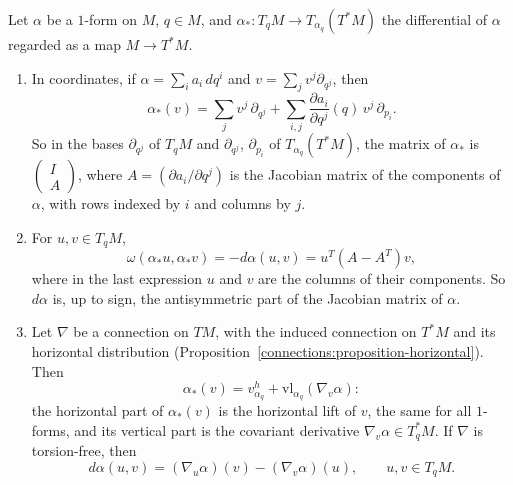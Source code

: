 \begin{proposition}\label{symplectic-geometry:proposition-derivative-section}
Let $\alpha$ be a $1$-form on $M$, $q \in M$, and $\alpha_* \colon T_qM \to T_{\alpha_q}(T^*M)$ the differential of $\alpha$ regarded as a map $M \to T^*M$.
\begin{enumerate}
\item In coordinates, if $\alpha = \sum_ia_i\,dq^i$ and $v = \sum_jv^j\partial_{q^j}$, then
\[
\alpha_*(v) = \sum_jv^j\,\partial_{q^j} + \sum_{i,j}\frac{\partial a_i}{\partial q^j}(q)\,v^j\,\partial_{p_i}.
\]
So in the bases $\partial_{q^j}$ of $T_qM$ and $\partial_{q^j}$, $\partial_{p_i}$ of $T_{\alpha_q}(T^*M)$, the matrix of $\alpha_*$ is $\begin{pmatrix} I \\ A \end{pmatrix}$, where $A = (\partial a_i/\partial q^j)$ is the
Jacobian matrix of the components of $\alpha$, with rows indexed by $i$ and columns by $j$.
\item For $u, v \in T_qM$,
\[
\omega(\alpha_*u, \alpha_*v) = -d\alpha(u, v) = u^{T}(A - A^{T})v,
\]
where in the last expression $u$ and $v$ are the columns of their components. So $d\alpha$ is, up to sign, the antisymmetric part of the Jacobian matrix of $\alpha$.
\item Let $\nabla$ be a connection on $TM$, with the induced connection on $T^*M$ and its horizontal distribution (Proposition~\ref{connections:proposition-horizontal}). Then
\[
\alpha_*(v) = v^h_{\alpha_q} + \mathrm{vl}_{\alpha_q}(\nabla_v\alpha):
\]
the horizontal part of $\alpha_*(v)$ is the horizontal lift of $v$, the same for all $1$-forms, and its vertical part is the covariant derivative $\nabla_v\alpha \in T^*_qM$. If $\nabla$ is torsion-free, then
\[
d\alpha(u, v) = (\nabla_u\alpha)(v) - (\nabla_v\alpha)(u), \qquad u, v \in T_qM .
\]
\end{enumerate}
\end{proposition}

